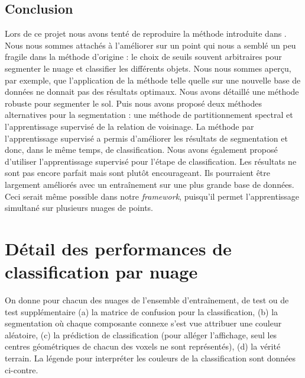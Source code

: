 \documentclass[a4paper, onecolumn, 11pt]{article}
\begin{document}


\subsection{Conclusion}

Lors de ce projet nous avons tenté de reproduire la méthode introduite dans \cite{aka_article}. Nous nous sommes attachés à l'améliorer sur un point qui nous a semblé un peu fragile dans la méthode d'origine : le choix de seuils souvent arbitraires pour segmenter le nuage et classifier les différents objets. Nous nous sommes aperçu, par exemple, que l'application de la méthode telle quelle sur une nouvelle base de données ne donnait pas des résultats optimaux. Nous avons détaillé une méthode robuste pour segmenter le sol. Puis nous avons proposé deux méthodes alternatives pour la segmentation : une méthode de partitionnement spectral et l'apprentissage supervisé de la relation de voisinage. La méthode par l'apprentissage supervisé a permis d'améliorer les résultats de segmentation et donc, dans le même temps, de classification. Nous avons également proposé d'utiliser l'apprentissage supervisé pour l'étape de classification. Les résultats ne sont pas encore parfait mais sont plutôt encourageant. Ils pourraient être largement améliorés avec un entraînement sur une plus grande base de données. Ceci serait même possible dans notre \emph{framework}, puisqu'il permet l'apprentissage simultané sur plusieurs nuages de points.

\newpage

\nocite{*}



\newpage
\appendix
\section{Détail des performances de classification par nuage}

\begin{figure}
\centering
{}
\end{figure}

On donne pour chacun des nuages de l'ensemble d'entraînement, de test ou de test supplémentaire (a) la matrice de confusion pour la classification, (b) la segmentation où chaque composante connexe s'est vue attribuer une couleur aléatoire, (c) la prédiction de classification (pour alléger l'affichage, seul les centres géométriques de chacun des voxels ne sont représentés), (d) la vérité terrain. La légende pour interpréter les couleurs de la classification sont données ci-contre.
\end{document}

